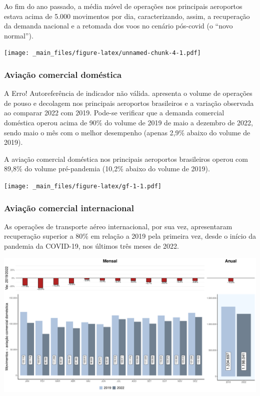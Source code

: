 \documentclass[
]{book}
\begin{document}
Ao fim do ano passado, a média móvel de operações nos principais aeroportos estava acima de 5.000 movimentos por dia, caracterizando, assim, a recuperação da demanda nacional e a retomada dos voos no cenário pós-covid (o ``novo normal'').

\texttt{[image: \_main\_files/figure-latex/unnamed-chunk-4-1.pdf]}

\hypertarget{aviauxe7uxe3o-comercial-domuxe9stica}{%
\subsubsection{Aviação comercial doméstica}\label{aviauxe7uxe3o-comercial-domuxe9stica}}

A Erro! Autoreferência de indicador não válida. apresenta o volume de operações de pouso e decolagem nos principais aeroportos brasileiros e a variação observada ao comparar 2022 com 2019. Pode-se verificar que a demanda comercial doméstica operou acima de 90\% do volume de 2019 de maio a dezembro de 2022, sendo maio o mês com o melhor desempenho (apenas 2,9\% abaixo do volume de 2019).

A aviação comercial doméstica nos principais aeroportos brasileiros operou com 89,8\% do volume pré-pandemia (10,2\% abaixo do volume de 2019).

\texttt{[image: \_main\_files/figure-latex/gf-1-1.pdf]}

\hypertarget{aviauxe7uxe3o-comercial-internacional}{%
\subsubsection{Aviação comercial internacional}\label{aviauxe7uxe3o-comercial-internacional}}

As operações de transporte aéreo internacional, por sua vez, apresentaram recuperação superior a 80\% em relação a 2019 pela primeira vez, desde o início da pandemia da COVID-19, nos últimos três meses de 2022.

\includegraphics{_main_files/figure-latex/unnamed-chunk-5-1.pdf}
\end{document}
